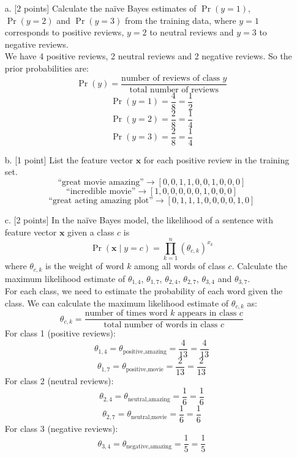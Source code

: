 \documentclass[a3paper,12pt]{extarticle} %
\begin{document}
\begin{enumerate}
    \item[a.] [2 points] Calculate the na\"ive Bayes estimates of $\Pr(y = 1)$, $\Pr(y = 2)$ and $\Pr(y = 3)$ from the training data, where $y = 1$ corresponds to positive reviews, $y = 2$ to neutral reviews and $y = 3$ to negative reviews.
    \\ We have 4 positive reviews, 2 neutral reviews and 2 negative reviews. So the prior probabilities are:
    \[
        \Pr(y) = \frac{\text{number of reviews of class } y}{\text{total number of reviews}}
    \]
    \[
    \Pr(y = 1) = \frac{4}{8} = \frac{1}{2}
    \]
    \[
    \Pr(y = 2) = \frac{2}{8} = \frac{1}{4}
    \]
    \[
    \Pr(y = 3) = \frac{2}{8} = \frac{1}{4}
    \]
    \item[b.] [1 point] List the feature vector $\mathbf{x}$ for each positive review in the training set.
    \[
    \text{``great movie amazing''} \rightarrow [0, 0, 1, 1, 0, 0, 1, 0, 0, 0]
    \]
    \[
    \text{``incredible movie''} \rightarrow [1, 0, 0, 0, 0, 0, 1, 0, 0, 0]
    \]
    \[
    \text{``great acting amazing plot''} \rightarrow [0, 1, 1, 1, 0, 0, 0, 0, 1, 0]
    \]
    \item[c.] [2 points] In the na\"ive Bayes model, the likelihood of a sentence with feature vector $\mathbf{x}$ given a class $c$ is
    \[
    \Pr(\mathbf{x} \mid y = c) = \prod_{k=1}^{n} (\theta_{c,k})^{x_k}
    \]
    where $\theta_{c,k}$ is the weight of word $k$ among all words of class $c$. Calculate the maximum likelihood estimate of $\theta_{1,4}$, $\theta_{1,7}$, $\theta_{2,4}$, $\theta_{2,7}$, $\theta_{3,4}$ and $\theta_{3,7}$.
    \\ For each class, we need to estimate the probability of each word given the class. We can calculate the maximum likelihood estimate of $\theta_{c,k}$ as:
    \[
    \theta_{c,k} = \frac{\text{number of times word } k \text{ appears in class } c}{\text{total number of words in class } c}
    \]
    For class 1 (positive reviews):
    \[
    \theta_{1,4} = \theta_{\text{positive}, \text{amazing}} = \frac{4}{13} = \frac{4}{13}
    \]
    \[
    \theta_{1,7} = \theta_{\text{positive}, \text{movie}} = \frac{2}{13} = \frac{2}{13}
    \]
    For class 2 (neutral reviews):
    \[
    \theta_{2,4} = \theta_{\text{neutral}, \text{amazing}} = \frac{1}{6} = \frac{1}{6}
    \]
    \[
    \theta_{2,7} = \theta_{\text{neutral}, \text{movie}} = \frac{1}{6} = \frac{1}{6}
    \]
    For class 3 (negative reviews):
    \[
    \theta_{3,4} = \theta_{\text{negative}, \text{amazing}} = \frac{1}{5} = \frac{1}{5}
\]
\end{enumerate}
\end{document}

